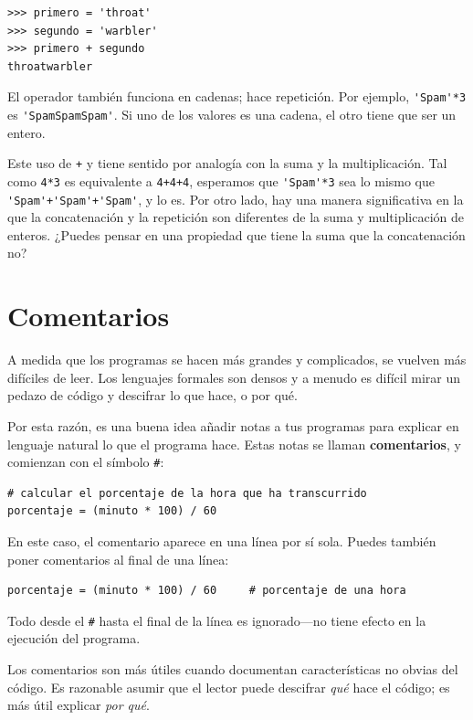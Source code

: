 \documentclass[10pt]{book}
\begin{document}
\begin{verbatim}
>>> primero = 'throat'
>>> segundo = 'warbler'
>>> primero + segundo
throatwarbler
\end{verbatim}
%
El operador {\tt *} también funciona en cadenas; hace repetición.
Por ejemplo, \verb"'Spam'*3" es \verb"'SpamSpamSpam'".  Si uno de los
valores es una cadena, el otro tiene que ser un entero.

Este uso de {\tt +} y {\tt *} tiene sentido por
analogía con la suma y la multiplicación.  Tal como {\tt 4*3} es
equivalente a {\tt 4+4+4}, esperamos que \verb"'Spam'*3" sea lo mismo que
\verb"'Spam'+'Spam'+'Spam'", y lo es.  Por otro lado, hay una
manera significativa en la que la concatenación y la repetición son
diferentes de la suma y multiplicación de enteros.
¿Puedes pensar en una propiedad que tiene la suma
que la concatenación no?


\section{Comentarios}

A medida que los programas se hacen más grandes y complicados, se vuelven más difíciles
de leer.  Los lenguajes formales son densos y a menudo es difícil
mirar un pedazo de código y descifrar lo que hace, o por qué.

Por esta razón, es una buena idea añadir notas a tus programas para explicar
en lenguaje natural lo que el programa hace.  Estas notas se llaman
{\bf comentarios}, y comienzan con el símbolo \verb"#":

\begin{verbatim}
# calcular el porcentaje de la hora que ha transcurrido
porcentaje = (minuto * 100) / 60
\end{verbatim}
%
En este caso, el comentario aparece en una línea por sí sola.  Puedes también poner
comentarios al final de una línea:

\begin{verbatim}
porcentaje = (minuto * 100) / 60     # porcentaje de una hora
\end{verbatim}
%
Todo desde el {\tt \#} hasta el final de la línea es ignorado---no
tiene efecto en la ejecución del programa.

Los comentarios son más útiles cuando documentan características no obvias del
código.  Es razonable asumir que el lector puede descifrar
{\em qué} hace el código; es más útil explicar {\em por qué}.
\end{document}
